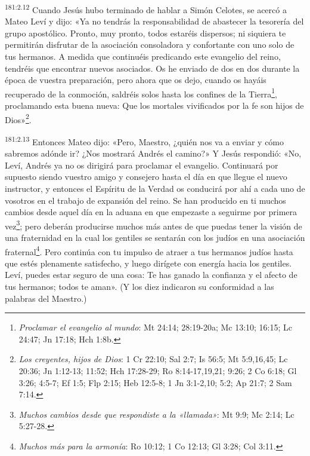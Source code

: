\par 
\textsuperscript{181:2.12} Cuando Jesús hubo terminado de hablar a Simón Celotes, se acercó a Mateo Leví y dijo: «Ya no tendrás la responsabilidad de abastecer la tesorería del grupo apostólico. Pronto, muy pronto, todos estaréis dispersos; ni siquiera te permitirán disfrutar de la asociación consoladora y confortante con uno solo de tus hermanos. A medida que continuéis predicando este evangelio del reino, tendréis que encontrar nuevos asociados. Os he enviado de dos en dos durante la época de vuestra preparación, pero ahora que os dejo, cuando os hayáis recuperado de la conmoción, saldréis solos hasta los confines de la Tierra\footnote{\textit{Proclamar el evangelio al mundo}: Mt 24:14; 28:19-20a; Mc 13:10; 16:15; Lc 24:47; Jn 17:18; Hch 1:8b.}, proclamando esta buena nueva: Que los mortales vivificados por la fe son hijos de Dios»\footnote{\textit{Los creyentes, hijos de Dios}: 1 Cr 22:10; Sal 2:7; Is 56:5; Mt 5:9,16,45; Lc 20:36; Jn 1:12-13; 11:52; Hch 17:28-29; Ro 8:14-17,19,21; 9:26; 2 Co 6:18; Gl 3:26; 4:5-7; Ef 1:5; Flp 2:15; Heb 12:5-8; 1 Jn 3:1-2,10; 5:2; Ap 21:7; 2 Sam 7:14.}.

\par 
\textsuperscript{181:2.13} Entonces Mateo dijo: «Pero, Maestro, ¿quién nos va a enviar y cómo sabremos adónde ir? ¿Nos mostrará Andrés el camino?» Y Jesús respondió: «No, Leví, Andrés ya no os dirigirá para proclamar el evangelio. Continuará por supuesto siendo vuestro amigo y consejero hasta el día en que llegue el nuevo instructor, y entonces el Espíritu de la Verdad os conducirá por ahí a cada uno de vosotros en el trabajo de expansión del reino. Se han producido en ti muchos cambios desde aquel día en la aduana en que empezaste a seguirme por primera vez\footnote{\textit{Muchos cambios desde que respondiste a la «llamada»}: Mt 9:9; Mc 2:14; Lc 5:27-28.}; pero deberán producirse muchos más antes de que puedas tener la visión de una fraternidad en la cual los gentiles se sentarán con los judíos en una asociación fraternal\footnote{\textit{Muchos más para la armonía}: Ro 10:12; 1 Co 12:13; Gl 3:28; Col 3:11.}. Pero continúa con tu impulso de atraer a tus hermanos judíos hasta que estés plenamente satisfecho, y luego dirígete con energía hacia los gentiles. Leví, puedes estar seguro de una cosa: Te has ganado la confianza y el afecto de tus hermanos; todos te aman». (Y los diez indicaron su conformidad a las palabras del Maestro.)

